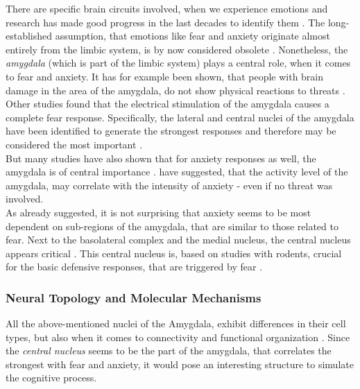         There are specific brain circuits involved, when we experience emotions and research has made good progress in the last decades to identify them \cite{Steimer.2002}. The long-established assumption, that emotions like fear and anxiety originate almost entirely from the limbic system, is by now considered obsolete \cite{LeDoux.2000}. 
        Nonetheless, the \textit{amygdala} (which is part of the limbic system) plays a central role, when it comes to fear and anxiety. 
        It has for example been shown, that people with brain damage in the area of the amygdala, do not show physical reactions to threats \cite{Phelps.2006}. 
        Other studies found that the electrical stimulation of the amygdala causes a complete fear response. Specifically, the lateral and central nuclei of the amygdala have been identified to generate the strongest responses and therefore may be considered the most important \cite{panksepp.1998}. \\
        But many studies have also shown that for anxiety responses as well, the amygdala is of central importance \cite{Ferry.2017}. 
        \textcite{Kim.2011} have suggested, that the activity level of the amygdala, may correlate with the intensity of anxiety - even if no threat was involved. \\
        As already suggested, it is not surprising that anxiety seems to be most dependent on sub-regions of the amygdala, that are similar to those related to fear. Next to the basolateral complex and the medial nucleus, the central nucleus appears critical \cite{McDonald.1982}. This central nucleus is, based on studies with rodents, crucial for the basic defensive responses, that are triggered by fear \cite{Davis.2001}.
        
        
    \subsubsection{Neural Topology and Molecular Mechanisms}
    
            All the above-mentioned nuclei of the Amygdala, exhibit differences in their cell types, but also when it comes to connectivity and functional organization \cite{McDonald.1982}.
            Since the \textit{central nucleus} seems to be the part of the amygdala, that correlates the strongest with fear and anxiety, it would pose an interesting structure to simulate the cognitive process. 
            
